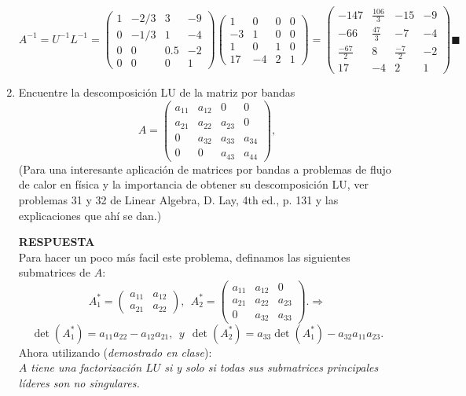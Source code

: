 \documentclass[11pt,letterpaper]{article}
\newcommand{\res}{\textbf{RESPUESTA}\\}
\begin{document}
\begin{enumerate}
$$A^{-1}=U^{-1}L^{-1} =\begin{pmatrix}
1&-2/3&3 &-9\\
0&-1/3&1 &-4\\
0&0&0.5&-2\\
0&0&0&1
\end{pmatrix}\begin{pmatrix}
1&0&0&0\\
-3&1&0&0\\
1&0&1&0\\
17&-4&2&1
\end{pmatrix} =\begin{pmatrix}
-147 & \frac{106}{3} & -15 & -9\\
-66 & \frac{47}{3} & -7 & -4\\
\frac{-67}{2} & 8 & \frac{-7}{2} & -2\\
17 & -4 & 2 & 1
\end{pmatrix}\blacksquare
$$
\item Encuentre la descomposición LU de la matriz por bandas
\begin{equation*}
A=\left(\begin{array}{cccc}
a_{11} & a_{12} &   0    &    0  \\
a_{21} & a_{22} & a_{23} &    0  \\
    0  & a_{32} & a_{33} & a_{34}\\
    0  &   0    & a_{43} & a_{44}
\end{array} \right),
\end{equation*}
(Para una interesante aplicación de matrices por bandas a problemas de flujo de calor en física y la importancia de obtener su descomposición LU, ver problemas 31 y 32 de Linear Algebra, D. Lay, 4th ed., p. 131 y las explicaciones que ahí se dan.)

\res
Para hacer un poco más facil este problema, definamos las siguientes submatrices de $A$:
$$A_1^*=\begin{pmatrix}
a_{11} & a_{12}\\
a_{21} & a_{22}
\end{pmatrix}, \ \ A_2^*=\begin{pmatrix}
a_{11} & a_{12} & 0\\
a_{21} & a_{22} & a_{23}\\
0 & a_{32} & a_{33}
\end{pmatrix}.\Rightarrow $$
$$\det(A_1^*)=a_{11}a_{22}-a_{12}a_{21}, \ \ y \ \ \det(A_2^*)=a_{33}\det(A_1^*)-a_{32}a_{11}a_{23}.$$
Ahora utilizando (\textit{demostrado en clase}):\\
\textit{$A$ tiene una factorización $LU$ si y solo si todas sus submatrices principales líderes son no singulares.}
\\


\end{enumerate}
\end{document}

